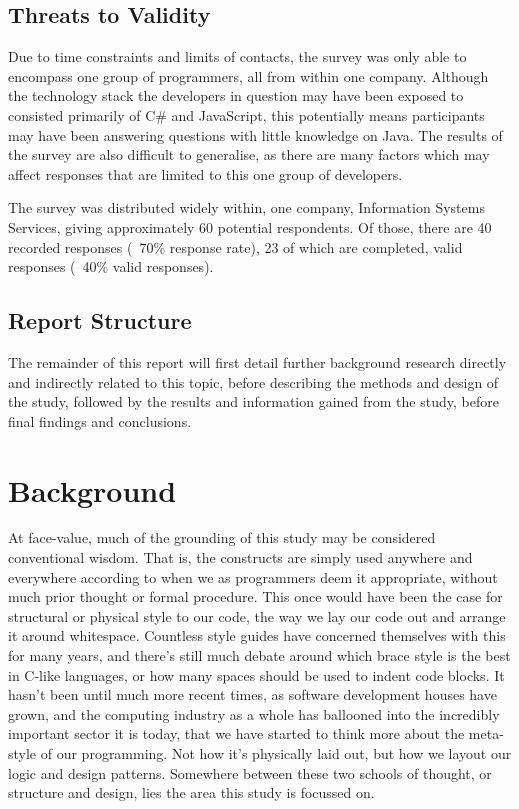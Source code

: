 \documentclass{article}
\begin{document}
    \subsection{Threats to Validity}
        Due to time constraints and limits of contacts, the survey was only able to encompass one group of programmers, all from within one company. Although the technology stack the developers in question may have been exposed to consisted primarily of C\# and JavaScript, this potentially means participants may have been answering questions with little knowledge on Java. The results of the survey are also difficult to generalise, as there are many factors which may affect responses that are limited to this one group of developers.

        The survey was distributed widely within, one company, Information Systems Services, giving approximately 60 potential respondents. Of those, there are 40 recorded responses  (~70\% response rate), 23 of which are completed, valid responses (~40\% valid responses).
    \subsection{Report Structure}
        The remainder of this report will first detail further background research directly and indirectly related to this topic, before describing the methods and design of the study, followed by the results and information gained from the study, before final findings and conclusions.
\newpage
\section{Background}
\label{sec:background}
    At face-value, much of the grounding of this study may be considered conventional wisdom. That is, the constructs are simply used anywhere and everywhere according to when we as programmers deem it appropriate, without much prior thought or formal procedure. This once would have been the case for structural or physical style to our code, the way we lay our code out and arrange it around whitespace. Countless style guides have concerned themselves with this for many years, and there's still much debate around which brace style is the best in C-like languages, or how many spaces should be used to indent code blocks. It hasn't been until much more recent times, as software development houses have grown, and the computing industry as a whole has ballooned into the incredibly important sector it is today, that we have started to think more about the meta-style of our programming. Not how it's physically laid out, but how we layout our logic and design patterns. Somewhere between these two schools of thought, or structure and design, lies the area this study is focussed on.
\end{document}
